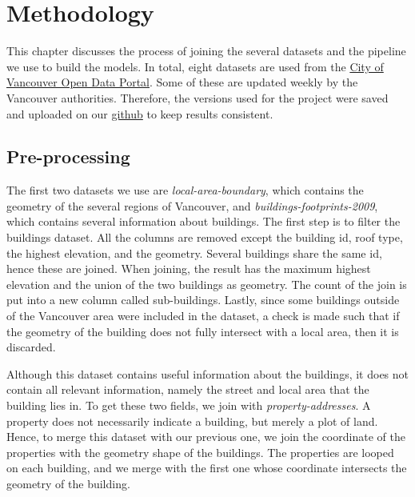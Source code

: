 \chapter{Methodology}


This chapter discusses the process of joining the several datasets and the pipeline we use to build the models. In total, eight datasets are used from the \href{https://opendata.vancouver.ca/pages/home/}{City of Vancouver Open Data Portal}. Some of these are updated weekly by the Vancouver authorities. Therefore, the versions used for the project were saved and uploaded on our \href{https://github.com/CowKeyMan/PredictingGraffitiUsingCityLayouts}{github} to keep results consistent.

\section{Pre-processing}

The first two datasets we use are \textit{local-area-boundary}, which contains the geometry of the several regions of Vancouver, and \textit{buildings-footprints-2009}, which contains several information about buildings. The first step is to filter the buildings dataset. All the columns are removed except the building id, roof type, the highest elevation, and the geometry. Several buildings share the same id, hence these are joined. When joining, the result has the maximum highest elevation and the union of the two buildings as geometry. The count of the join is put into a new column called sub-buildings. Lastly, since some buildings outside of the Vancouver area were included in the dataset, a check is made such that if the geometry of the building does not fully intersect with a local area, then it is discarded.

Although this dataset contains useful information about the buildings, it does not contain all relevant information, namely the street and local area that the building lies in. To get these two fields, we join with \textit{property-addresses}. A property does not necessarily indicate a building, but merely a plot of land. Hence, to merge this dataset with our previous one, we join the coordinate of the properties with the geometry shape of the buildings. The properties are looped on each building, and we merge with the first one whose coordinate intersects the geometry of the building.

